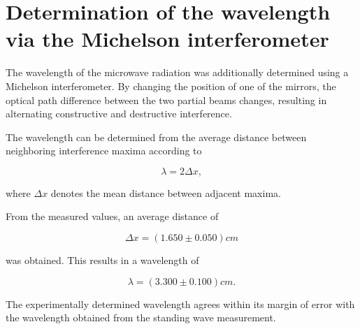 \section{Determination of the wavelength via the Michelson interferometer}
\noindent
\setlength{\parindent}{0pt}

The wavelength of the microwave radiation was additionally determined using a Michelson interferometer. By changing the position of one of the mirrors, the optical path difference between the two partial beams changes, resulting in alternating constructive and destructive interference.

The wavelength can be determined from the average distance between neighboring interference maxima according to

\begin{equation}
    \lambda = 2 \Delta x,
\end{equation}

where $\Delta x$ denotes the mean distance between adjacent maxima.

From the measured values, an average distance of

\begin{equation}
    {\Delta x}
    =
    (1.650 \pm 0.050)cm
\end{equation}

was obtained. This results in a wavelength of

\begin{equation}
    \lambda
    =
    (3.300 \pm 0.100)cm.
\end{equation}

The experimentally determined wavelength agrees within its margin of error with the wavelength obtained from the standing wave measurement.

